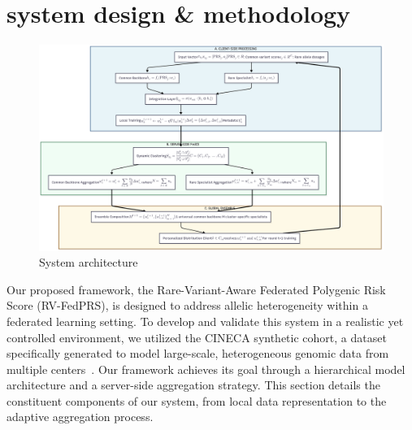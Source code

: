 \documentclass[conference]{IEEEtran}
\begin{document}
\section{\textbf{system design \& methodology}}
\label{sec:methodology}
\begin{figure}[!t]
\centerline{\includegraphics[width=0.95\linewidth]{images/ICAIIC System Diagram III.png}} %
\caption{System architecture}
\label{systemoverview}
\vspace{-0.5cm}
\end{figure}

Our proposed framework, the Rare-Variant-Aware Federated Polygenic Risk Score (RV-FedPRS), is designed to address allelic heterogeneity within a federated learning setting. To develop and validate this system in a realistic yet controlled environment, we utilized the CINECA synthetic cohort, a dataset specifically generated to model large-scale, heterogeneous genomic data from multiple centers~\cite{CinecaProjectWebsite}. Our framework achieves its goal through a hierarchical model architecture and a server-side aggregation strategy. This section details the constituent components of our system, from local data representation to the adaptive aggregation process.
\end{document}
